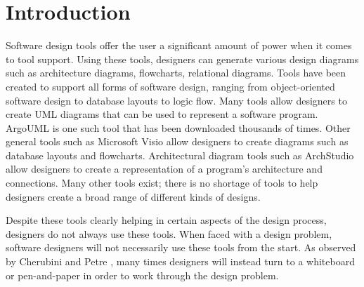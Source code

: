 \chapter{Introduction}

Software design tools offer the user a significant amount of power when it comes to tool support. 
Using these tools, designers can generate various design diagrams such as architecture diagrams, flowcharts, relational diagrams.
Tools have been created to support all forms of software design, ranging from object-oriented software design to database layouts to logic flow.
Many tools allow designers to create UML diagrams that can be used to represent a software program. ArgoUML \cite{argouml} is one such tool that has been downloaded thousands of times.
Other general tools such as Microsoft Visio \cite{visio} allow designers to create diagrams such as database layouts and flowcharts. 
Architectural diagram tools such as ArchStudio \cite{archstudio} allow designers to create a representation of a program's architecture and connections.
Many other tools exist; there is no shortage of tools to help designers create a broad range of different kinds of designs.


Despite these tools clearly helping in certain aspects of the design process, designers do not always use these tools.
When faced with a design problem, software designers will not necessarily use these tools from the start. 
As observed by Cherubini \cite{cherubini} and Petre \cite{petre}, many times designers will instead turn to a whiteboard or pen-and-paper in order to work through the design problem.


